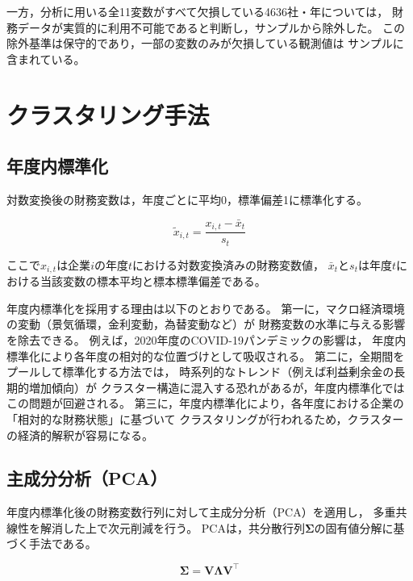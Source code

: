 一方，分析に用いる全11変数がすべて欠損している\num{4636}社・年については，
財務データが実質的に利用不可能であると判断し，サンプルから除外した。
この除外基準は保守的であり，一部の変数のみが欠損している観測値は
サンプルに含まれている。

\section{クラスタリング手法}
\label{sec:clustering}

\subsection{年度内標準化}
\label{subsec:standardization}

対数変換後の財務変数は，年度ごとに平均0，標準偏差1に標準化する。

\begin{equation}
  \tilde{x}_{i,t} = \frac{x_{i,t} - \bar{x}_t}{s_t}
  \label{eq:zscore}
\end{equation}

ここで$x_{i,t}$は企業$i$の年度$t$における対数変換済みの財務変数値，
$\bar{x}_t$と$s_t$は年度$t$における当該変数の標本平均と標本標準偏差である。

年度内標準化を採用する理由は以下のとおりである。
第一に，マクロ経済環境の変動（景気循環，金利変動，為替変動など）が
財務変数の水準に与える影響を除去できる。
例えば，2020年度のCOVID-19パンデミックの影響は，
年度内標準化により各年度の相対的な位置づけとして吸収される。
第二に，全期間をプールして標準化する方法では，
時系列的なトレンド（例えば利益剰余金の長期的増加傾向）が
クラスター構造に混入する恐れがあるが，年度内標準化ではこの問題が回避される。
第三に，年度内標準化により，各年度における企業の「相対的な財務状態」に基づいて
クラスタリングが行われるため，クラスターの経済的解釈が容易になる。

\subsection{主成分分析（PCA）}
\label{subsec:pca}

年度内標準化後の財務変数行列に対して主成分分析（PCA）を適用し，
多重共線性を解消した上で次元削減を行う。
PCAは，共分散行列$\boldsymbol{\Sigma}$の固有値分解に基づく手法である。

\begin{equation}
  \boldsymbol{\Sigma} = \mathbf{V} \boldsymbol{\Lambda} \mathbf{V}^{\top}
  \label{eq:pca-eigen}
\end{equation}

